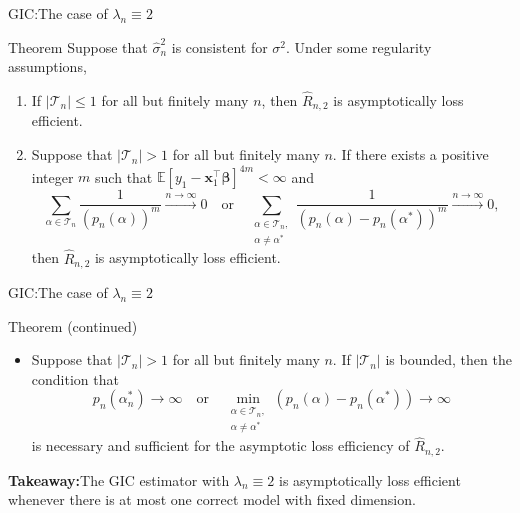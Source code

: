 \documentclass{beamer}
\newcommand{\0}{\emptyset}
\newcommand{\Ep}[1]{\mathbb{E}\left[ #1 \right]}
\newcommand{\paren}[1]{\left(#1 \right)}
\newcommand{\Tcal}{\mathcal{T}_{n}}
\newcommand{\x}{\boldsymbol{x}}
\newcommand{\bbeta}{\boldsymbol{\beta}}
\newcommand{\sigmahat}{\hat{\sigma}^{2}_{n}}
\newcommand{\1}{\mathmybb{1}}
\begin{document}
\begin{frame}{GIC:\@ The case of \(\lambda_{n} \equiv 2\)}
  
\begin{block}{Theorem}
    Suppose that \(\sigmahat\) is consistent for \(\sigma^{2}\). Under some regularity assumptions, 
    \begin{enumerate}
        \item If \(|\Tcal|\leq1\) for all but finitely many \(n\), then \(\hat{R}_{n,2}\) is asymptotically loss efficient.
        \item Suppose that \(|\Tcal|> 1\) for all but finitely many \(n\). If there exists a positive integer \(m\) such that \(\Ep{y_{1} - \x_{1}^{\top}\bbeta}^{4m}<\infty\) and 
        \begin{equation}\label{eq:conditionsums}
            \sum_{\alpha\in\Tcal}\frac{1}{\paren{p_{n}(\alpha)}^{m}}\xrightarrow{n\to\infty} 0 \quad\text{or}\quad \sum_{\substack{\alpha\in\Tcal,\\ \alpha\neq\alpha^{*}}}\frac{1}{\paren{p_{n}(\alpha) - p_{n}(\alpha^{*})}^{m}}\xrightarrow{n\to\infty} 0,
        \end{equation}
        then \(\hat{R}_{n,2}\) is asymptotically loss efficient.
    \end{enumerate}
\end{block}
\end{frame}

\begin{frame}{GIC:\@ The case of \(\lambda_{n} \equiv 2\)}
    \begin{block}{Theorem (continued)}
        \begin{itemize}
            \item Suppose that \(|\Tcal|>1\) for all but finitely many \(n\). 
            If \(|\Tcal|\) is bounded,
            then the condition that
            \begin{equation}
                \label{eq:conditionP}
                p_{n}(\alpha^{*}_{n})\to\infty\quad\text{or}\quad \min_{\substack{\alpha\in\Tcal,\\ \alpha\neq\alpha^{*}}}\paren{p_{n}(\alpha) - p_{n}(\alpha^{*})}\to\infty
            \end{equation}
            is necessary and sufficient for the asymptotic loss efficiency of \(\hat{R}_{n,2}\).
        \end{itemize}

    \end{block}
    \textbf{Takeaway:}\@ The GIC estimator with \(\lambda_{n} \equiv 2\) is asymptotically loss efficient whenever there is at most one correct model with fixed dimension.
\end{frame}
\end{document}
